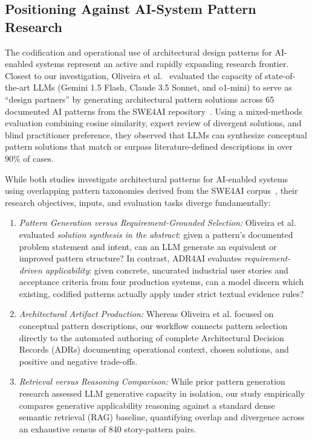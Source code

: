 \subsection{Positioning Against AI-System Pattern Research}
\label{sec:related-work-positioning}

The codification and operational use of architectural design patterns for
AI-enabled systems represent an active and rapidly expanding research frontier.
Closest to our investigation, Oliveira et al.~\cite{oliveira2026designpartners}
evaluated the capacity of state-of-the-art LLMs (Gemini 1.5 Flash, Claude 3.5 Sonnet,
and o1-mini) to serve as ``design partners'' by generating architectural pattern
solutions across 65 documented AI patterns from the SWE4AI repository~\cite{aiPatternsRepository}.
Using a mixed-methods evaluation combining cosine similarity, expert review of
divergent solutions, and blind practitioner preference, they observed that LLMs
can synthesize conceptual pattern solutions that match or surpass literature-defined
descriptions in over 90\% of cases.

While both studies investigate architectural patterns for AI-enabled systems using
overlapping pattern taxonomies derived from the SWE4AI corpus~\cite{heiland2023patterns,aiPatternsRepository},
their research objectives, inputs, and evaluation tasks diverge fundamentally:
\begin{enumerate}
    \item \emph{Pattern Generation versus Requirement-Grounded Selection:}
    Oliveira et al. evaluated \emph{solution synthesis in the abstract}: given a
    pattern's documented problem statement and intent, can an LLM generate an
    equivalent or improved pattern structure? In contrast, ADR4AI evaluates
    \emph{requirement-driven applicability}: given concrete, uncurated industrial
    user stories and acceptance criteria from four production systems, can a model
    discern which existing, codified patterns actually apply under strict textual
    evidence rules?
    \item \emph{Architectural Artifact Production:} Whereas Oliveira et al. focused
    on conceptual pattern descriptions, our workflow connects pattern selection
    directly to the automated authoring of complete Architectural Decision Records
    (ADRs) documenting operational context, chosen solutions, and positive and
    negative trade-offs.
    \item \emph{Retrieval versus Reasoning Comparison:} While prior pattern
    generation research assessed LLM generative capacity in isolation, our study
    empirically compares generative applicability reasoning against a standard dense
    semantic retrieval (RAG) baseline, quantifying overlap and divergence across
    an exhaustive census of 840 story-pattern pairs.
\end{enumerate}

